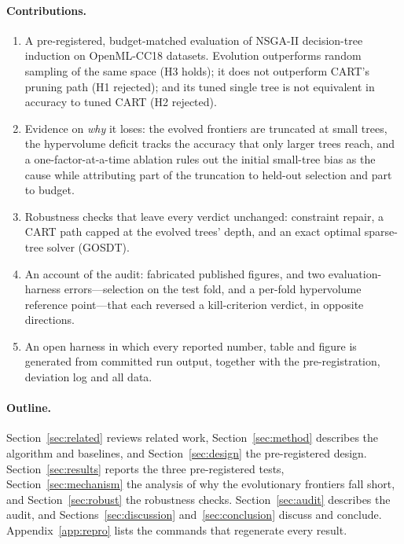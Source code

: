 \documentclass[11pt]{article}
\begin{document}
\paragraph{Contributions.}
\begin{enumerate}
\item A pre-registered, budget-matched evaluation of NSGA-II decision-tree induction on
\NDatasets{} OpenML-CC18 datasets. Evolution outperforms random sampling of the same
space (H3 holds); it does not outperform CART's pruning path (H1 rejected); and its tuned
single tree is not equivalent in accuracy to tuned CART (H2 rejected).
\item Evidence on \emph{why} it loses: the evolved frontiers are truncated at small trees,
the hypervolume deficit tracks the accuracy that only larger trees reach, and a
one-factor-at-a-time ablation rules out the initial small-tree bias as the cause while
attributing part of the truncation to held-out selection and part to budget.
\item Robustness checks that leave every verdict unchanged: constraint repair, a CART
path capped at the evolved trees' depth, and an exact optimal sparse-tree solver (GOSDT).
\item An account of the audit: fabricated published figures, and two evaluation-harness
errors---selection on the test fold, and a per-fold hypervolume reference point---that
each reversed a kill-criterion verdict, in opposite directions.
\item An open harness in which every reported number, table and figure is generated from
committed run output, together with the pre-registration, deviation log and all data.
\end{enumerate}

\paragraph{Outline.} Section~\ref{sec:related} reviews related work,
Section~\ref{sec:method} describes the algorithm and baselines, and
Section~\ref{sec:design} the pre-registered design. Section~\ref{sec:results} reports the
three pre-registered tests, Section~\ref{sec:mechanism} the analysis of why the
evolutionary frontiers fall short, and Section~\ref{sec:robust} the robustness checks.
Section~\ref{sec:audit} describes the audit, and Sections~\ref{sec:discussion}
and~\ref{sec:conclusion} discuss and conclude. Appendix~\ref{app:repro} lists the commands
that regenerate every result.

\end{document}
